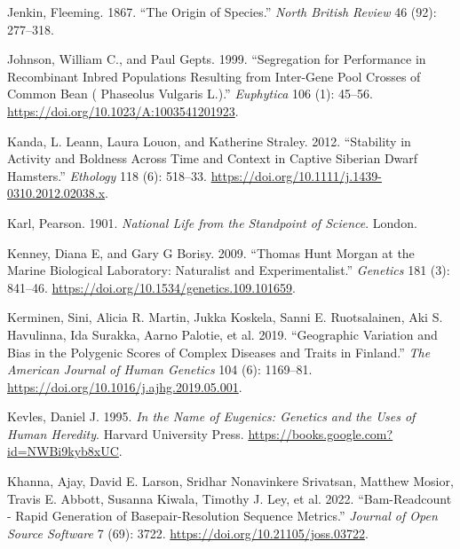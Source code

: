 \documentclass[
]{book}
\newlength{\cslhangindent}
\newlength{\cslentryspacingunit} %
\newenvironment{CSLReferences}[2] %
 {%
  \setlength{\parindent}{0pt}
  \ifodd #1
  \let\oldpar\par
  \def\par{\hangindent=\cslhangindent\oldpar}
  \fi
  \setlength{\parskip}{#2\cslentryspacingunit}
 }%
 {}
\begin{document}
\begin{CSLReferences}{1}{0}
\leavevmode{}%
Jenkin, Fleeming. 1867. {``The Origin of Species.''} \emph{North British Review} 46 (92): 277--318.

\leavevmode{}%
Johnson, William C., and Paul Gepts. 1999. {``Segregation for Performance in Recombinant Inbred Populations Resulting from Inter-Gene Pool Crosses of Common Bean ( {Phaseolus} Vulgaris {L}.).''} \emph{Euphytica} 106 (1): 45--56. \url{https://doi.org/10.1023/A:1003541201923}.

\leavevmode{}%
Kanda, L. Leann, Laura Louon, and Katherine Straley. 2012. {``Stability in {Activity} and {Boldness Across Time} and {Context} in {Captive Siberian Dwarf Hamsters}.''} \emph{Ethology} 118 (6): 518--33. \url{https://doi.org/10.1111/j.1439-0310.2012.02038.x}.

\leavevmode{}%
Karl, Pearson. 1901. \emph{National {Life} from the Standpoint of {Science}}. {London}.

\leavevmode{}%
Kenney, Diana E, and Gary G Borisy. 2009. {``Thomas {Hunt Morgan} at the {Marine Biological Laboratory}: {Naturalist} and {Experimentalist}.''} \emph{Genetics} 181 (3): 841--46. \url{https://doi.org/10.1534/genetics.109.101659}.

\leavevmode{}%
Kerminen, Sini, Alicia R. Martin, Jukka Koskela, Sanni E. Ruotsalainen, Aki S. Havulinna, Ida Surakka, Aarno Palotie, et al. 2019. {``Geographic {Variation} and {Bias} in the {Polygenic Scores} of {Complex Diseases} and {Traits} in {Finland}.''} \emph{The American Journal of Human Genetics} 104 (6): 1169--81. \url{https://doi.org/10.1016/j.ajhg.2019.05.001}.

\leavevmode{}%
Kevles, Daniel J. 1995. \emph{In the {Name} of {Eugenics}: {Genetics} and the {Uses} of {Human Heredity}}. {Harvard University Press}. \url{https://books.google.com?id=NWBi9kyb8xUC}.

\leavevmode{}%
Khanna, Ajay, David E. Larson, Sridhar Nonavinkere Srivatsan, Matthew Mosior, Travis E. Abbott, Susanna Kiwala, Timothy J. Ley, et al. 2022. {``Bam-Readcount - Rapid Generation of Basepair-Resolution Sequence Metrics.''} \emph{Journal of Open Source Software} 7 (69): 3722. \url{https://doi.org/10.21105/joss.03722}.


\end{CSLReferences}
\end{document}

